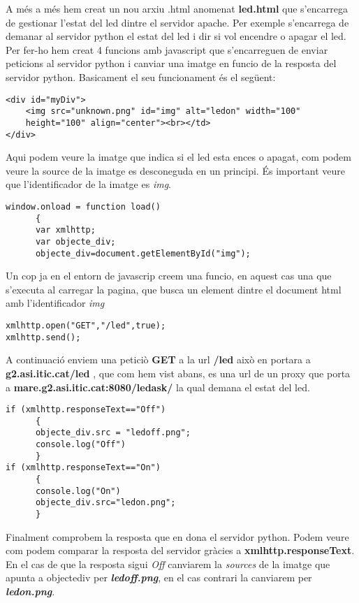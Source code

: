 \documentclass[11p]{article}
\begin{document}
A més a més hem creat un nou arxiu .html anomenat \textbf{led.html} que s'encarrega de gestionar l'estat del led dintre el servidor apache. Per exemple s'encarrega de demanar al servidor python el estat del led i dir si vol encendre o apagar el led. Per fer-ho hem creat 4 funcions amb javascript que s'encarreguen de enviar peticions al servidor python i canviar una imatge en funcio de la resposta del servidor python. Basicament el seu funcionament és el següent:
\newline
\begin{lstlisting}
<div id="myDiv">
	<img src="unknown.png" id="img" alt="ledon" width="100" 
	height="100" align="center"><br></td>
</div>
\end{lstlisting}
Aqui podem veure la imatge que indica si el led esta ences o apagat, com podem veure la source de la imatge es desconeguda en un principi. És important veure que l'identificador de la imatge es \textit{img}.
\newline
\begin{lstlisting}
window.onload = function load()
      {
      var xmlhttp;
      var objecte_div;
      objecte_div=document.getElementById("img");
\end{lstlisting}
Un cop ja en el entorn de javascrip creem una funcio, en aquest cas una que s'executa al carregar la pagina, que busca un element dintre el document html amb l'identificador \textit{img}
\newline
\begin{lstlisting}
xmlhttp.open("GET","/led",true);
xmlhttp.send();
\end{lstlisting}
A continuació enviem una peticiò \textbf{GET} a la url \textbf{/led} això en portara a \textbf{g2.asi.itic.cat/led} , que com hem vist abans, es una url de un proxy que porta a \textbf{mare.g2.asi.itic.cat:8080/ledask/} la qual demana el estat del led.
\newline
\begin{lstlisting}
if (xmlhttp.responseText=="Off")
      {
      objecte_div.src = "ledoff.png";
      console.log("Off")
      }
if (xmlhttp.responseText=="On")
      {
      console.log("On")
      objecte_div.src="ledon.png";
      }
\end{lstlisting}
Finalment comprobem la resposta que en dona el servidor python. Podem veure com podem comparar la resposta del servidor gràcies a \textbf{xmlhttp.responseText}. En el cas de que la resposta sigui \textit{Off} canviarem la \textit{sources} de la imatge que apunta a objecte\textunderscore div per \textbf{\textit{ledoff.png}}, en el cas contrari la canviarem per \textbf{\textit{ledon.png}}.
\end{document}
